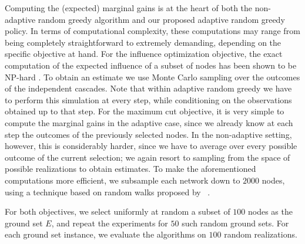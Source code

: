 \documentclass{article}
\newcommand{\citet}[1]{\citeauthor{#1}~\shortcite{#1}}
\begin{document}
Computing the (expected) marginal gains is at the heart of both the non-adaptive random greedy algorithm and our proposed adaptive random greedy policy.
In terms of computational complexity, these computations may range from being completely straightforward to extremely demanding, depending on the specific objective at hand.
For the influence optimization objective, the exact computation of the expected influence of a subset of nodes has been shown to be NP-hard \cite{kempe03}.
To obtain an estimate we use Monte Carlo sampling over the outcomes of the independent cascades.
Note that within adaptive random greedy we have to perform this simulation at every step, while conditioning on the observations obtained up to that step.
For the maximum cut objective, it is very simple to compute the marginal gains in the adaptive case, since we already know at each step the outcomes of the previously selected nodes.
In the non-adaptive setting, however, this is considerably harder, since we have to average over every possible outcome of the current selection; we again resort to sampling from the space of possible realizations to obtain estimates.
To make the aforementioned computations more efficient, we subsample each network down to $2000$ nodes, using a technique based on random walks proposed by \citet{leskovec06}.

For both objectives, we select uniformly at random a subset of $100$ nodes as the ground set $E$, and repeat the experiments for $50$ such random ground sets.
For each ground set instance, we evaluate the algorithms on $100$ random realizations.
\end{document}
